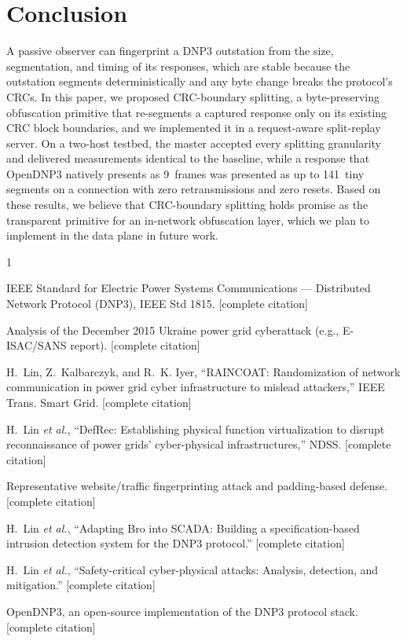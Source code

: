 \documentclass[conference]{IEEEtran}
\begin{document}
\section{Conclusion}

A passive observer can fingerprint a DNP3 outstation from the size, segmentation,
and timing of its responses, which are stable because the outstation segments
deterministically and any byte change breaks the protocol's CRCs. In this paper,
we proposed CRC-boundary splitting, a byte-preserving obfuscation primitive that
re-segments a captured response only on its existing CRC block boundaries, and we
implemented it in a request-aware split-replay server. On a two-host testbed, the
master accepted every splitting granularity and delivered measurements identical
to the baseline, while a response that OpenDNP3 natively presents as 9~frames was
presented as up to 141~tiny segments on a connection with zero retransmissions
and zero resets. Based on these results, we believe that CRC-boundary splitting
holds promise as the transparent primitive for an in-network obfuscation layer,
which we plan to implement in the data plane in future work.

\begin{thebibliography}{1}

IEEE Standard for Electric Power Systems Communications --- Distributed Network
Protocol (DNP3), IEEE Std 1815. [complete citation]

Analysis of the December 2015 Ukraine power grid cyberattack (e.g., E-ISAC/SANS
report). [complete citation]

H.~Lin, Z.~Kalbarczyk, and R.~K. Iyer, ``RAINCOAT: Randomization of network
communication in power grid cyber infrastructure to mislead attackers,'' IEEE
Trans. Smart Grid. [complete citation]

H.~Lin \emph{et al.}, ``DefRec: Establishing physical function virtualization to
disrupt reconnaissance of power grids' cyber-physical infrastructures,'' NDSS.
[complete citation]

Representative website/traffic fingerprinting attack and padding-based defense.
[complete citation]

H.~Lin \emph{et al.}, ``Adapting Bro into SCADA: Building a specification-based
intrusion detection system for the DNP3 protocol.'' [complete citation]

H.~Lin \emph{et al.}, ``Safety-critical cyber-physical attacks: Analysis,
detection, and mitigation.'' [complete citation]

OpenDNP3, an open-source implementation of the DNP3 protocol stack. [complete
citation]

\end{thebibliography}
\end{document}
